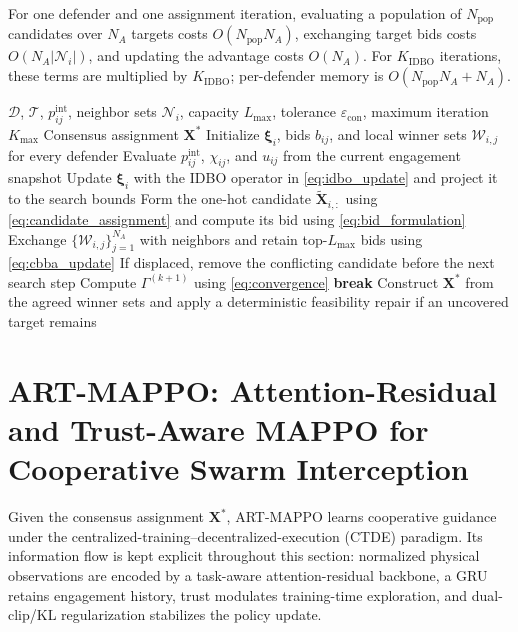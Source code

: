 \documentclass[lettersize,journal]{IEEEtran}
\begin{document}
For one defender and one assignment iteration, evaluating a population of $N_{\mathrm{pop}}$
candidates over $N_A$ targets costs $O(N_{\mathrm{pop}}N_A)$, exchanging target bids costs
$O(N_A|\mathcal N_i|)$, and updating the advantage costs $O(N_A)$. For $K_{\mathrm{IDBO}}$
iterations, these terms are multiplied by $K_{\mathrm{IDBO}}$; per-defender memory is
$O(N_{\mathrm{pop}}N_A+N_A)$.

\begin{algorithm}[!t]
\caption{Distributed Consensus-Based IDBO Target Assignment}
\label{alg:idbo}
\footnotesize
\begin{algorithmic}[1]
\REQUIRE $\mathcal D$, $\mathcal T$, $p_{ij}^{\mathrm{int}}$, neighbor sets
$\mathcal N_i$, capacity $L_{\max}$, tolerance $\varepsilon_{\mathrm{con}}$,
maximum iteration $K_{\max}$
\ENSURE Consensus assignment $\mathbf X^{*}$
\STATE Initialize $\boldsymbol\xi_i$, bids $b_{ij}$, and local winner sets
$\mathcal W_{i,j}$ for every defender
        \STATE Evaluate $p_{ij}^{\mathrm{int}}$, $\chi_{ij}$, and
        $u_{ij}$ from the current engagement snapshot
        \STATE Update $\boldsymbol\xi_i$ with the IDBO operator in
        \eqref{eq:idbo_update} and project it to the search bounds
        \STATE Form the one-hot candidate $\widetilde{\mathbf X}_{i,:}$ using
        \eqref{eq:candidate_assignment} and compute its bid using
        \eqref{eq:bid_formulation}
        \STATE Exchange $\{\mathcal W_{i,j}\}_{j=1}^{N_A}$ with neighbors and
        retain top-$L_{\max}$ bids using \eqref{eq:cbba_update}
        \STATE If displaced, remove the conflicting candidate before the next search step
    \ENDFOR
    \STATE Compute $\Gamma^{(k+1)}$ using \eqref{eq:convergence}
        \STATE \textbf{break}
    \ENDIF
\ENDFOR
\STATE Construct $\mathbf X^{*}$ from the agreed winner sets and apply a deterministic
feasibility repair if an uncovered target remains
\end{algorithmic}
\end{algorithm}
 
\section{ART-MAPPO: Attention-Residual and Trust-Aware MAPPO for Cooperative Swarm Interception}
\label{sec:cooperative_algorithm}

Given the consensus assignment $\mathbf X^{*}$, ART-MAPPO learns cooperative guidance under
the centralized-training--decentralized-execution (CTDE) paradigm. Its information flow is
kept explicit throughout this section: normalized physical observations are encoded by a
task-aware attention-residual backbone, a GRU retains engagement history, trust modulates
training-time exploration, and dual-clip/KL regularization stabilizes the policy update.
\end{document}
